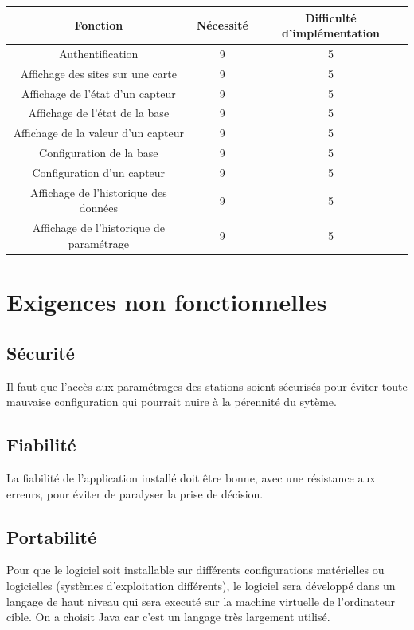 \begin{tabular}{|c|c|c|}
	\hline Fonction & Nécessité & Difficulté d'implémentation\\
	\hline 
	 Authentification & 9 & 5\\
	 Affichage des sites sur une carte & 9 & 5\\
	 Affichage de l'état d'un capteur & 9 & 5\\
	 Affichage de l'état de la base & 9 & 5\\
	 Affichage de la valeur d'un capteur & 9 & 5\\
	 Configuration de la base & 9 & 5\\
	 Configuration d'un capteur & 9 & 5\\
	 Affichage de l'historique des données & 9 & 5\\
	 Affichage de l'historique de paramétrage & 9 & 5\\
	\hline
\end{tabular}


\section{Exigences non fonctionnelles}
\subsection{Sécurité}
Il faut que l'accès aux paramétrages des stations soient sécurisés pour éviter toute mauvaise configuration qui pourrait nuire à la pérennité du sytème.

\subsection{Fiabilité}
La fiabilité de l'application installé doit être bonne, avec une résistance aux erreurs, pour éviter de paralyser la prise de décision.

\subsection{Portabilité}
Pour que le logiciel soit installable sur différents configurations matérielles ou logicielles (systèmes d'exploitation différents), le logiciel sera développé dans un langage de haut niveau qui sera executé sur la machine virtuelle de l'ordinateur cible. On a choisit Java car c'est un langage très largement utilisé.

